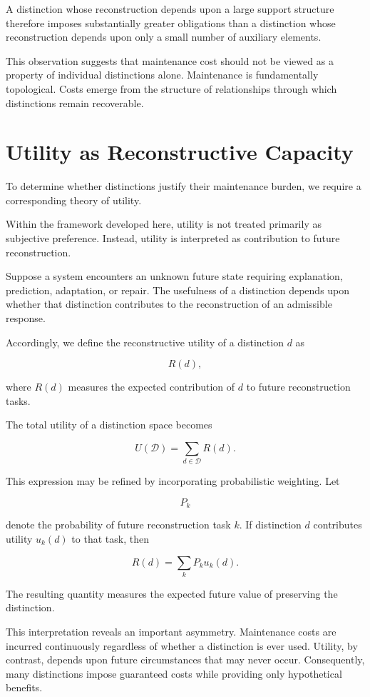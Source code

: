 \documentclass[12pt,oneside]{book}
\theoremstyle{plain} \newtheorem{theorem}{Theorem}[chapter] \newtheorem{lemma}[theorem]{Lemma} \newtheorem{proposition}[theorem]{Proposition} \newtheorem{corollary}[theorem]{Corollary}
\theoremstyle{definition} \newtheorem{definition}[theorem]{Definition} \newtheorem{axiom}[theorem]{Axiom} \newtheorem{construction}[theorem]{Construction}
\theoremstyle{remark} \newtheorem{remark}[theorem]{Remark} \newtheorem{example}[theorem]{Example}
\newcommand{\D}{\mathcal{D}} \newcommand{\R}{\mathcal{R}} \newcommand{\F}{\mathcal{F}} \newcommand{\U}{\mathcal{U}} \newcommand{\M}{\mathcal{M}} \newcommand{\G}{\Gamma}
\begin{document}
A distinction whose reconstruction depends upon a large support structure therefore imposes substantially greater obligations than a distinction whose reconstruction depends upon only a small number of auxiliary elements.

This observation suggests that maintenance cost should not be viewed as a property of individual distinctions alone. Maintenance is fundamentally topological. Costs emerge from the structure of relationships through which distinctions remain recoverable.

\section{Utility as Reconstructive Capacity}

To determine whether distinctions justify their maintenance burden, we require a corresponding theory of utility.

Within the framework developed here, utility is not treated primarily as subjective preference. Instead, utility is interpreted as contribution to future reconstruction.

Suppose a system encounters an unknown future state requiring explanation, prediction, adaptation, or repair. The usefulness of a distinction depends upon whether that distinction contributes to the reconstruction of an admissible response.

Accordingly, we define the reconstructive utility of a distinction $d$ as

\[
R(d),
\]

where $R(d)$ measures the expected contribution of $d$ to future reconstruction tasks.

The total utility of a distinction space becomes

\[
U(\D)
=
\sum_{d\in\D}
R(d).
\]

This expression may be refined by incorporating probabilistic weighting. Let

\[
P_k
\]

denote the probability of future reconstruction task $k$. If distinction $d$ contributes utility $u_k(d)$ to that task, then

\[
R(d)
=
\sum_k
P_k u_k(d).
\]

The resulting quantity measures the expected future value of preserving the distinction.

This interpretation reveals an important asymmetry. Maintenance costs are incurred continuously regardless of whether a distinction is ever used. Utility, by contrast, depends upon future circumstances that may never occur. Consequently, many distinctions impose guaranteed costs while providing only hypothetical benefits.
\end{document}
